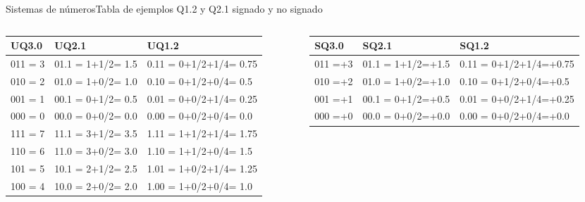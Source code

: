  \begin{frame}[t]{Sistemas de números}{Tabla de ejemplos Q1.2 y Q2.1 signado y no signado }
    \scriptsize
    \begin{columns}[t]
       \begin{column}[t]{.5\textwidth}
          \begin{table}[]
             \begin{tabular}{|l|l|l|}
             \hline
                UQ3.0   &        UQ2.1      &     UQ1.2             \\
             \hline
                011 = 3 & 01.1 = 1+1/2= 1.5 & 0.11 = 0+1/2+1/4= 0.75\\
                010 = 2 & 01.0 = 1+0/2= 1.0 & 0.10 = 0+1/2+0/4= 0.5 \\
                001 = 1 & 00.1 = 0+1/2= 0.5 & 0.01 = 0+0/2+1/4= 0.25\\
                000 = 0 & 00.0 = 0+0/2= 0.0 & 0.00 = 0+0/2+0/4= 0.0 \\
                111 = 7 & 11.1 = 3+1/2= 3.5 & 1.11 = 1+1/2+1/4= 1.75\\
                110 = 6 & 11.0 = 3+0/2= 3.0 & 1.10 = 1+1/2+0/4= 1.5 \\
                101 = 5 & 10.1 = 2+1/2= 2.5 & 1.01 = 1+0/2+1/4= 1.25\\
                100 = 4 & 10.0 = 2+0/2= 2.0 & 1.00 = 1+0/2+0/4= 1.0 \\
             \hline
             \end{tabular}
          \end{table}
       \end{column}
       \hspace{5pt}
       \hspace{5pt}
       \begin{column}[t]{.5\textwidth}
          \begin{table}[]
             \begin{tabular}{|l|l|l|}
             \hline
                SQ3.0   &        SQ2.1      &     SQ1.2             \\
             \hline
                011 =+3 & 01.1 = 1+1/2=+1.5 & 0.11 = 0+1/2+1/4=+0.75\\
                010 =+2 & 01.0 = 1+0/2=+1.0 & 0.10 = 0+1/2+0/4=+0.5 \\
                001 =+1 & 00.1 = 0+1/2=+0.5 & 0.01 = 0+0/2+1/4=+0.25\\
                000 =+0 & 00.0 = 0+0/2=+0.0 & 0.00 = 0+0/2+0/4=+0.0 \\

\end{tabular}
\end{table}
\end{column}
\end{columns}
\end{frame}
